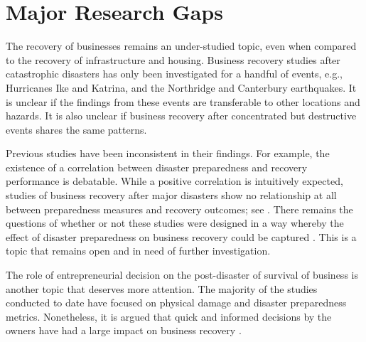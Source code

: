 \section{Major Research Gaps} 
The recovery of businesses remains an under-studied topic, even when compared to the recovery of infrastructure and housing. Business recovery studies after catastrophic disasters has only been investigated for a handful of events, e.g., Hurricanes Ike and Katrina, and the Northridge and Canterbury earthquakes. It is unclear if the findings from these events are transferable to other locations and hazards. It is also unclear if business recovery after concentrated but destructive events shares the same patterns. \ 

Previous studies have been inconsistent in their findings. For example, the existence of a correlation between disaster preparedness and recovery performance is debatable. While a positive correlation is intuitively expected, studies of business recovery after major disasters show no relationship at all between preparedness measures and recovery outcomes; see \citet{webb2000businesses}. There remains the questions of whether or not these studies were designed in a way whereby the effect of disaster preparedness on business recovery could be captured \citep{xiao2014hazard}. This is a topic that remains open and in need of further investigation.\ 

The role of entrepreneurial decision on the post-disaster of survival of business is another topic that deserves more attention. The majority of the studies conducted to date have focused on physical damage and disaster preparedness metrics. Nonetheless, it is argued that quick and informed decisions by the owners have had a large impact on business recovery \citep{morrish2020post}.\

